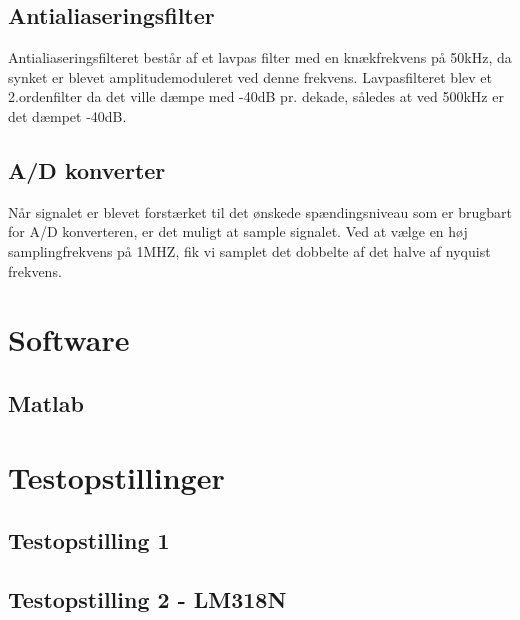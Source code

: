 \subsection{Antialiaseringsfilter}
Antialiaseringsfilteret består af et lavpas filter med en knækfrekvens på 50kHz, da synket er blevet amplitudemoduleret ved denne frekvens. Lavpasfilteret blev et 2.ordenfilter da det ville dæmpe med -40dB pr. dekade, således at ved 500kHz er det dæmpet -40dB.



\subsection{A/D konverter}
Når signalet er blevet forstærket til det ønskede spændingsniveau som er brugbart for A/D konverteren, er det muligt at sample signalet. Ved at vælge en høj samplingfrekvens på 1MHZ, fik vi samplet det dobbelte af det halve af nyquist frekvens.

\section{Software}
\subsection{Matlab}

\section{Testopstillinger}
\subsection{Testopstilling 1}
\subsection{Testopstilling 2 - LM318N}
